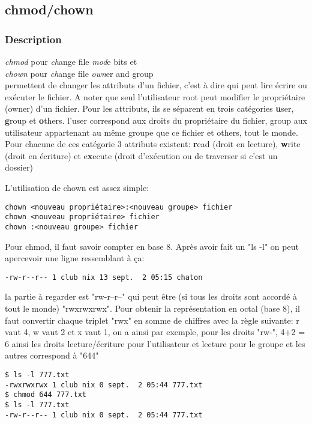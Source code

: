 \subsection*{chmod/chown}
\subsubsection*{Description}
\noindent \emph{chmod} pour \emph{ch}ange file \emph{mod}e bits et\\
\emph{chown} pour  \emph{ch}ange file \emph{own}er and group\\
permettent de changer les attributs d'un fichier, c'est à dire qui peut lire écrire ou exécuter le fichier.
A noter que seul l'utilisateur root peut modifier le propriétaire (owner) d'un fichier.
Pour les attributs, ils se séparent en trois catégories \textbf{u}ser, \textbf{g}roup et \textbf{o}thers.
l'user correspond aux droits du propriétaire du fichier, group aux utilisateur appartenant au même groupe que ce fichier et others, tout le monde.\\
Pour chacune de ces catégorie 3 attributs existent: \textbf{r}ead (droit en lecture), \textbf{w}rite (droit en écriture) et e\textbf{x}ecute (droit d’exécution ou de traverser si c'est un dossier)

\noindent L'utilisation de chown est assez simple:
\begin{lstlisting}
chown <nouveau propriétaire>:<nouveau groupe> fichier
chown <nouveau propriétaire> fichier
chown :<nouveau groupe> fichier
\end{lstlisting}

\noindent
Pour chmod, il faut savoir compter en base 8. Après avoir fait un "ls -l" on peut apercevoir une ligne ressemblant à ça:
\begin{lstlisting}
-rw-r--r-- 1 club nix 13 sept.  2 05:15 chaton
\end{lstlisting}
la partie à regarder est "rw-r--r--" qui peut être (si tous les droits sont accordé à tout le monde) "rwxrwxrwx".
Pour obtenir la représentation en octal (base 8), il faut convertir chaque triplet "rwx" en somme de chiffres avec la règle suivante:
r vaut 4, w vaut 2 et x vaut 1, on a ainsi par exemple, pour les droits "rw-", 4+2 = 6
ainsi les droits lecture/écriture pour l'utilisateur et lecture pour le groupe et les autres correspond à "644"

\begin{lstlisting}
$ ls -l 777.txt
-rwxrwxrwx 1 club nix 0 sept.  2 05:44 777.txt
$ chmod 644 777.txt
$ ls -l 777.txt
-rw-r--r-- 1 club nix 0 sept.  2 05:44 777.txt
\end{lstlisting}

